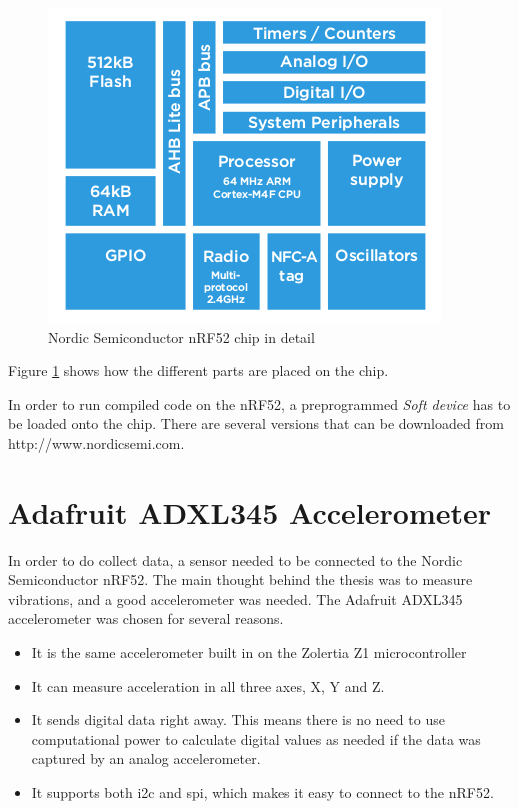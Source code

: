 \begin{figure}[ht]
    \centering
    \includegraphics[scale=0.6]{nrf52Detailed.png}    
    \caption{Nordic Semiconductor nRF52 chip in detail }
    \label{fig:nrf52chipDetail}
\end{figure} 

Figure \ref{fig:nrf52chipDetail} shows how the different parts are placed on the chip. 

In order to run compiled code on the nRF52, a preprogrammed \textit{Soft device} has to be loaded onto the chip. There are several versions that can be downloaded from http://www.nordicsemi.com. 




\section{Adafruit ADXL345 Accelerometer}

In order to do collect data, a sensor needed to be connected to the Nordic Semiconductor nRF52. The main thought behind the thesis was to measure vibrations, and a good accelerometer was needed. The Adafruit ADXL345 accelerometer was chosen for several reasons. 

\begin{itemize}
  \item It is the same accelerometer built in on the Zolertia Z1 microcontroller
  \item It can measure acceleration in all three axes, X, Y and Z.
  \item It sends digital data right away. This means there is no need to use computational power to calculate digital values as needed if the data was captured by an analog accelerometer. 
  \item It supports both \gls{i2c} and \gls{spi}, which makes it easy to connect to the nRF52. 
\end{itemize}


